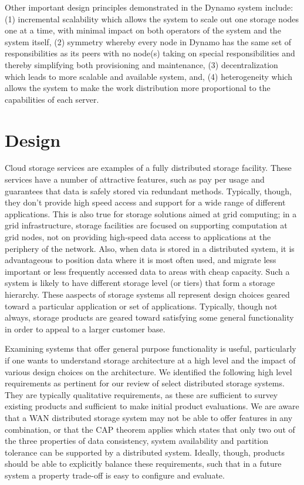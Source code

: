 \documentclass[11pt]{article}
\begin{document}
Other important design principles demonstrated in the Dynamo system
include: (1) incremental scalability which allows the system to scale
out one storage nodes one at a time, with minimal impact on both
operators of the system and the system itself, (2) symmetry whereby
every node in Dynamo has the same set of responsibilities as its peers
with no node(s) taking on special responsibilities and thereby
simplifying both provisioning and maintenance, (3) decentralization
which leads to more scalable and available system, and, (4)
heterogeneity which allows the system to make the work distribution
more proportional to the capabilities of each server.


\section{Design}
Cloud storage services are examples of a fully distributed storage 
facility. These services have a number of attractive features, such 
as pay per usage and guarantees that data is safely stored via 
redundant methods. Typically, though, they don't provide high speed 
access and support for a wide range of different applications. This 
is also true for storage solutions aimed at grid computing; in a grid 
infrastructure, storage facilities are focused on supporting computation 
at grid nodes, not on providing high-speed data access to applications at 
the periphery  of the network.  Also, when data is stored in a distributed 
system, it is advantageous to position data where it is most often used, 
and migrate less important or less frequently accessed data to areas with 
cheap capacity. Such a system is likely to have different storage level 
(or tiers) that form a storage hierarchy. These aaspects of storage systems 
all represent design choices geared toward a particular application or set
of applications. Typically, though not always, storage products are geared 
toward satisfying some general functionality in order to appeal to a larger 
customer base. 

Examining systems that offer general purpose functionality is useful, 
particularly if one wants to understand storage architecture at a high level 
and the impact of various design choices on the architecture. We 
identified the following high level requirements as pertinent for our review  
of select distributed storage systems. They are typically qualitative 
requirements, as these are sufficient to survey existing products and 
sufficient to make initial product evaluations. We are aware that a WAN 
distributed storage system may not be able to offer features in any 
combination, or that the CAP theorem applies which states that only two 
out of the three properties of data consistency, system availability and 
partition tolerance can be supported by a distributed system. Ideally, 
though, products should be able to explicitly balance these requirements, 
such that in a future system a property trade-off is easy to configure 
and evaluate.
\end{document}
